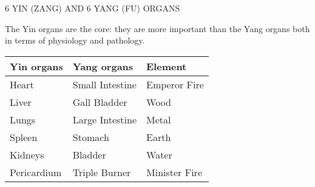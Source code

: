 \documentclass[
	11pt, %
]{beamer}
\theoremstyle{newblock}
\begin{document}
\begin{frame}{6 YIN (ZANG) AND 6 YANG (FU) ORGANS}
	\begin{block}{}
		The Yin organs are the core: they are more important than the Yang 
organs both in terms of physiology and pathology. 
	\end{block}
		\begin{tabular}{lll}
		\hline \hline
		Yin organs &Yang organs &Element \\ \hline\hline 
		Heart &Small Intestine & Emperor Fire \\
		Liver & Gall Bladder & Wood \\
		Lungs & Large Intestine &Metal\\
		Spleen &Stomach &Earth\\
		Kidneys& Bladder &Water\\
		Pericardium &Triple Burner &Minister Fire\\
				\hline
		\end{tabular}
	
\end{frame}
\end{document}
